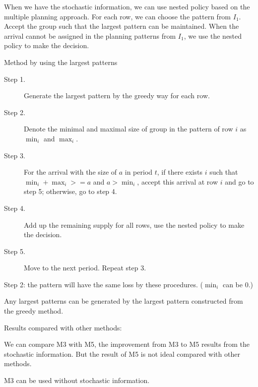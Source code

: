 

When we have the stochastic information, we can use nested policy based on the multiple planning approach. 
For each row, we can choose the pattern from $I_1$. Accept the group such that the largest pattern can be maintained. When the arrival cannot be assigned in the planning patterns from $I_1$, we use the nested policy to make the decision. 



\begin{algorithm}[H]\label{algo_largest}
  \caption{Method by using the largest patterns}
  \begin{description}
    \item[Step 1.] Generate the largest pattern by the greedy way for each row.
    \item[Step 2.] Denote the minimal and maximal size of group in the pattern of row $i$ as $\min_i$ and $\max_i$. 
    \item[Step 3.] For the arrival with the size of $a$ in period $t$, if there exists $i$ such that $\min_i + \max_i >= a$ and $a > \min_i$, accept this arrival at row $i$ and go to step 5; otherwise, go to step 4.
    \item[Step 4.] Add up the remaining supply for all rows, use the nested policy to make the decision.
    \item[Step 5.] Move to the next period. Repeat step 3. 
  \end{description}
\end{algorithm}

Step 2: the pattern will have the same loss by these procedures. ($\min_i$ can be 0.)

\begin{lem}
  Any largest patterns can be generated by the largest pattern constructed from the greedy method.
\end{lem}

Results compared with other methods:

We can compare M3 with M5, the improvement from M3 to M5 results from the stochastic information. But the result of M5 is not ideal compared with other methods.

M3 can be used without stochastic information.

